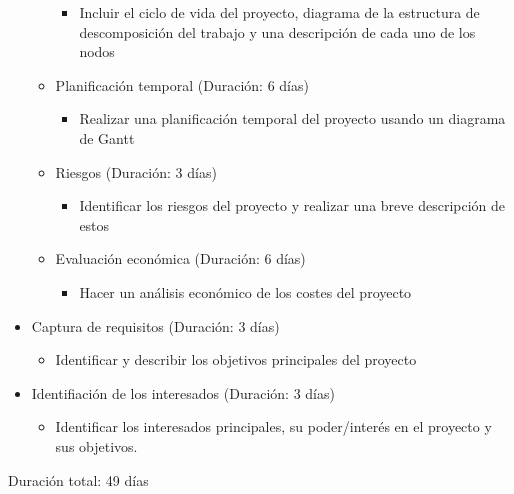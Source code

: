 \documentclass{report}
\begin{document}
\begin{itemize}
\begin{itemize}
                        \begin{itemize}
                            \item Incluir el ciclo de vida del proyecto, diagrama de la estructura de descomposición del trabajo y una descripción de cada uno de los nodos
                        \end{itemize}
                        \item Planificación temporal (Duración: 6 días)
                        \begin{itemize}
                            \item Realizar una planificación temporal del proyecto usando un diagrama de Gantt
                        \end{itemize}
                        \item Riesgos (Duración: 3 días)
                        \begin{itemize}
                            \item Identificar los riesgos del proyecto y realizar una breve descripción de estos
                        \end{itemize}
                        \item Evaluación económica (Duración: 6 días)
                        \begin{itemize}
                            \item Hacer un análisis económico de los costes del proyecto
                        \end{itemize}
                    \end{itemize}
                    \item Captura de requisitos (Duración: 3 días)
                    \begin{itemize}
                        \item Identificar y describir los objetivos principales del proyecto
                    \end{itemize}
                    \item Identifiación de los interesados (Duración: 3 días)
                    \begin{itemize}
                        \item Identificar los interesados principales, su poder/interés en el proyecto y sus objetivos.
                    \end{itemize}
                \end{itemize}
                Duración total: 49 días
\end{document}
